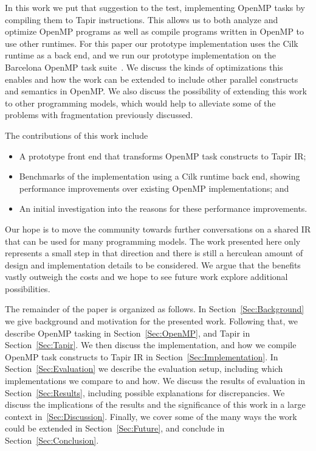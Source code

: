 \documentclass[sigconf]{acmart}
\begin{document}
In this work we put that suggestion to the test, implementing OpenMP tasks by
compiling them to Tapir instructions. This allows us to both analyze and optimize
OpenMP programs as well as compile programs written in OpenMP to use other runtimes.
For this paper our prototype implementation uses the Cilk runtime as a back end,
and we run our prototype implementation on the Barcelona OpenMP task
suite~\cite{barcelona}.  We discuss the kinds of optimizations this enables and
how the work can be extended to include other parallel constructs and semantics
in OpenMP. We also discuss the possibility of extending this work to other
programming models, which would help to alleviate some of the problems with
fragmentation previously discussed.

The contributions of this work include
\begin{itemize}
  \item A prototype front end that transforms OpenMP task constructs to Tapir IR;
  \item Benchmarks of the implementation using a Cilk runtime back end, showing
        performance improvements over existing OpenMP implementations; and
  \item An initial investigation into the reasons for these performance improvements.
\end{itemize}
Our hope is to move the community towards further conversations on a 
shared IR that can be used for many programming models. The work presented here only
represents a small step in that direction and there is still a herculean amount
of design and implementation details to be considered. We argue that the benefits vastly outweigh 
the costs and we hope to see future work explore additional possibilities. 


The remainder of the paper is organized as follows.  In Section~\ref{Sec:Background} 
we give background and motivation for the presented work. Following that, we describe OpenMP
tasking in Section~\ref{Sec:OpenMP}, and Tapir in Section~\ref{Sec:Tapir}. We then 
discuss the implementation, and how we compile OpenMP task constructs to Tapir IR in
Section~\ref{Sec:Implementation}. In Section~\ref{Sec:Evaluation} we describe the 
evaluation setup, including which implementations we compare to and how. We discuss
the results of evaluation in Section~\ref{Sec:Results}, including possible
explanations for discrepancies. We discuss the implications of the results and the
significance of this work in a large context in~\ref{Sec:Discussion}. Finally,
we cover some of the many ways the work could be extended in
Section~\ref{Sec:Future}, and conclude in Section~\ref{Sec:Conclusion}.
\end{document}
